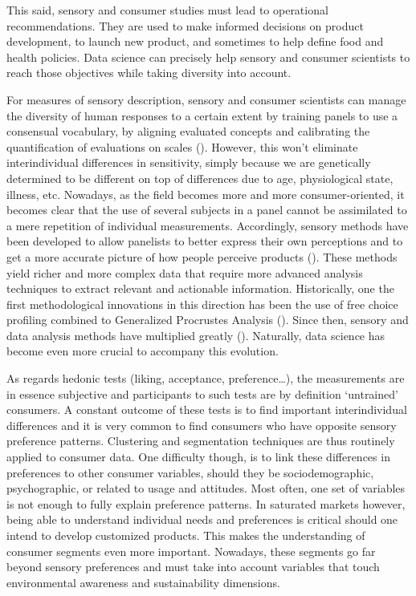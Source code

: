 \documentclass[
]{book}
\begin{document}
This said, sensory and consumer studies must lead to operational recommendations. They are used to make informed decisions on product development, to launch new product, and sometimes to help define food and health policies. Data science can precisely help sensory and consumer scientists to reach those objectives while taking diversity into account.

For measures of sensory description, sensory and consumer scientists can manage the diversity of human responses to a certain extent by training panels to use a consensual vocabulary, by aligning evaluated concepts and calibrating the quantification of evaluations on scales (\citet{Bleibaum2020}). However, this won't eliminate interindividual differences in sensitivity, simply because we are genetically determined to be different on top of differences due to age, physiological state, illness, etc. Nowadays, as the field becomes more and more consumer-oriented, it becomes clear that the use of several subjects in a panel cannot be assimilated to a mere repetition of individual measurements. Accordingly, sensory methods have been developed to allow panelists to better express their own perceptions and to get a more accurate picture of how people perceive products (\citet{Varela2012}). These methods yield richer and more complex data that require more advanced analysis techniques to extract relevant and actionable information. Historically, one the first methodological innovations in this direction has been the use of free choice profiling combined to Generalized Procrustes Analysis (\citet{Williams1984}). Since then, sensory and data analysis methods have multiplied greatly (\citet{Delarue2015}). Naturally, data science has become even more crucial to accompany this evolution.

As regards hedonic tests (liking, acceptance, preference\ldots), the measurements are in essence subjective and participants to such tests are by definition `untrained' consumers. A constant outcome of these tests is to find important interindividual differences and it is very common to find consumers who have opposite sensory preference patterns. Clustering and segmentation techniques are thus routinely applied to consumer data. One difficulty though, is to link these differences in preferences to other consumer variables, should they be sociodemographic, psychographic, or related to usage and attitudes. Most often, one set of variables is not enough to fully explain preference patterns. In saturated markets however, being able to understand individual needs and preferences is critical should one intend to develop customized products. This makes the understanding of consumer segments even more important. Nowadays, these segments go far beyond sensory preferences and must take into account variables that touch environmental awareness and sustainability dimensions.
\end{document}
